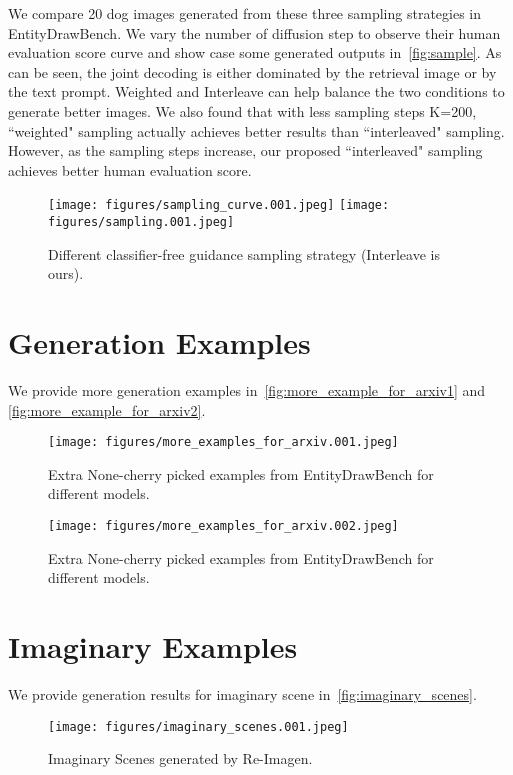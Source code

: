 \documentclass{article} \usepackage{iclr2023_conference,times}
\newcommand{\modelname}{{Re-Imagen}\xspace}
\begin{document}
We compare 20 dog images generated from these three sampling strategies in EntityDrawBench. We vary the number of diffusion step to observe their human evaluation score curve and show case some generated outputs in~\autoref{fig:sample}. As can be seen, the joint decoding is either dominated by the retrieval image or by the text prompt. Weighted and Interleave can help balance the two conditions to generate better images. We also found that with less sampling steps K=200, ``weighted" sampling actually achieves better results than ``interleaved" sampling. However, as the sampling steps increase, our proposed ``interleaved" sampling achieves better human evaluation score. 



\begin{figure}[!h]
    \centering
    \texttt{[image: figures/sampling\_curve.001.jpeg]}
    \texttt{[image: figures/sampling.001.jpeg]}
    \caption{Different classifier-free guidance sampling strategy (Interleave is ours). }
    \vspace{-1ex}
    \label{fig:sample}
\end{figure}

\clearpage
\section{Generation Examples}
\label{appendix:more_results}
We provide more generation examples in~\autoref{fig:more_example_for_arxiv1} and \autoref{fig:more_example_for_arxiv2}.
\begin{figure}[!h]
    \centering
    \texttt{[image: figures/more\_examples\_for\_arxiv.001.jpeg]}
    \caption{Extra None-cherry picked examples from EntityDrawBench for different models. }
    \vspace{-1ex}
    \label{fig:more_example_for_arxiv1}
\end{figure}

\begin{figure}[!h]
    \centering
    \texttt{[image: figures/more\_examples\_for\_arxiv.002.jpeg]}
    \caption{Extra None-cherry picked examples from EntityDrawBench for different models. }
    \vspace{-1ex}
    \label{fig:more_example_for_arxiv2}
\end{figure}

\clearpage
\section{Imaginary Examples}
We provide generation results for imaginary scene in~\autoref{fig:imaginary_scenes}.
\begin{figure}[!h]
    \centering
    \texttt{[image: figures/imaginary\_scenes.001.jpeg]}
    \caption{Imaginary Scenes generated by \modelname. }
    \vspace{-1ex}
    \label{fig:imaginary_scenes}
\end{figure}
\end{document}
